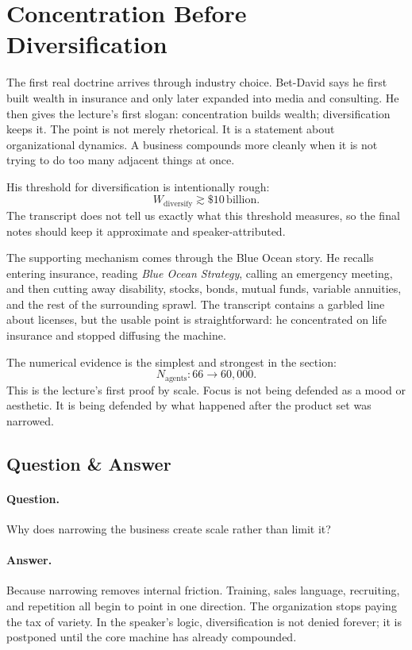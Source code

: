 \section{Concentration Before Diversification}

The first real doctrine arrives through industry choice. Bet-David says he first built wealth in insurance and only later expanded into media and consulting. He then gives the lecture's first slogan: concentration builds wealth; diversification keeps it. The point is not merely rhetorical. It is a statement about organizational dynamics. A business compounds more cleanly when it is not trying to do too many adjacent things at once.

His threshold for diversification is intentionally rough:
\begin{equation}
W_{\text{diversify}} \gtrsim \$10\,\text{billion}.
\end{equation}
The transcript does not tell us exactly what this threshold measures, so the final notes should keep it approximate and speaker-attributed.

The supporting mechanism comes through the Blue Ocean story. He recalls entering insurance, reading \emph{Blue Ocean Strategy}, calling an emergency meeting, and then cutting away disability, stocks, bonds, mutual funds, variable annuities, and the rest of the surrounding sprawl. The transcript contains a garbled line about licenses, but the usable point is straightforward: he concentrated on life insurance and stopped diffusing the machine.

The numerical evidence is the simplest and strongest in the section:
\begin{equation}
N_{\text{agents}} : 66 \longrightarrow 60{,}000.
\end{equation}
This is the lecture's first proof by scale. Focus is not being defended as a mood or aesthetic. It is being defended by what happened after the product set was narrowed.

\subsection{Question \& Answer}

\paragraph{Question.} Why does narrowing the business create scale rather than limit it?

\paragraph{Answer.} Because narrowing removes internal friction. Training, sales language, recruiting, and repetition all begin to point in one direction. The organization stops paying the tax of variety. In the speaker's logic, diversification is not denied forever; it is postponed until the core machine has already compounded.

